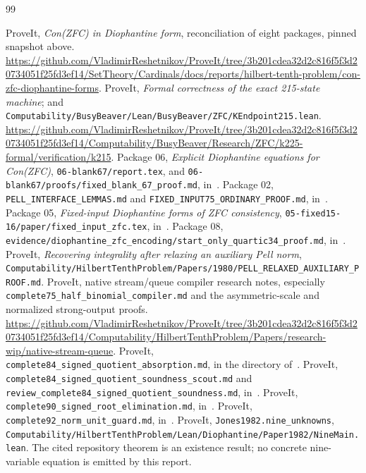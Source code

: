 \documentclass[11pt,a4paper]{article}
\theoremstyle{remark}\newtheorem{remark}[theorem]{Remark}
\newcommand{\file}[1]{\nolinkurl{#1}}
\begin{document}
\begin{thebibliography}{99}\small\raggedright
{} ProveIt, \emph{Con(ZFC) in Diophantine form},
reconciliation of eight packages, pinned snapshot above.
\url{https://github.com/VladimirReshetnikov/ProveIt/tree/3b201cdea32d2c816f5f3d20734051f25fd3ef14/SetTheory/Cardinals/docs/reports/hilbert-tenth-problem/con-zfc-diophantine-forms}.
 ProveIt, \emph{Formal correctness of the exact
215-state machine}; and \file{Computability/BusyBeaver/Lean/BusyBeaver/ZFC/KEndpoint215.lean}.
\url{https://github.com/VladimirReshetnikov/ProveIt/tree/3b201cdea32d2c816f5f3d20734051f25fd3ef14/Computability/BusyBeaver/Research/ZFC/k225-formal/verification/k215}.
 Package 06, \emph{Explicit Diophantine equations for
Con(ZFC)}, \file{06-blank67/report.tex}, and
\file{06-blank67/proofs/fixed_blank_67_proof.md}, in~\cite{reconcile}.
 Package 02, \file{PELL_INTERFACE_LEMMAS.md} and
\file{FIXED_INPUT75_ORDINARY_PROOF.md}, in~\cite{reconcile}.
 Package 05, \emph{Fixed-input Diophantine forms of
ZFC consistency}, \file{05-fixed15-16/paper/fixed_input_zfc.tex},
in~\cite{reconcile}.
 Package 08,
\file{evidence/diophantine_zfc_encoding/start_only_quartic34_proof.md},
in~\cite{reconcile}.
 ProveIt, \emph{Recovering integrality after relaxing an
auxiliary Pell norm},
\file{Computability/HilbertTenthProblem/Papers/1980/PELL_RELAXED_AUXILIARY_PROOF.md}.
 ProveIt, native stream/queue compiler research notes,
especially \file{complete75_half_binomial_compiler.md} and the
asymmetric-scale and normalized strong-output proofs.
\url{https://github.com/VladimirReshetnikov/ProveIt/tree/3b201cdea32d2c816f5f3d20734051f25fd3ef14/Computability/HilbertTenthProblem/Papers/research-wip/native-stream-queue}.
 ProveIt,
\file{complete84_signed_quotient_absorption.md}, in the directory of~\cite{compiler}.
 ProveIt,
\file{complete84_signed_quotient_soundness_scout.md} and
\file{review_complete84_signed_quotient_soundness.md}, in~\cite{compiler}.
 ProveIt,
\file{complete90_signed_root_elimination.md}, in~\cite{compiler}.
 ProveIt,
\file{complete92_norm_unit_guard.md}, in~\cite{compiler}.
 ProveIt, \file{Jones1982.nine_unknowns},
\file{Computability/HilbertTenthProblem/Lean/Diophantine/Paper1982/NineMain.lean}.
The cited repository theorem is an existence result; no concrete
nine-variable equation is emitted by this report.
\end{thebibliography}
\end{document}

